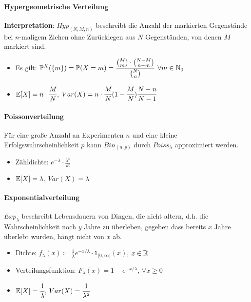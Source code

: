 \newpage
\paragraph{Hypergeometrische Verteilung}
\textbf{Interpretation}: $Hyp_{(N,M,n)}$ beschreibt die Anzahl der markierten Gegenstände bei $n$-maligem Ziehen ohne Zurücklegen aus $N$ Gegenständen, von denen $M$ markiert sind.
\begin{itemize}
	\item Es gilt: $\mathbb{P}^X(\{m\})=\mathbb{P}(X=m)=\cfrac{\binom{M}{m}\cdot\binom{N-M}{n-m}}{\binom{N}{n}}$ \qquad$\forall m\in\mathbb{N}_0$
	\item $\mathbb{E}[X]=n\cdot\cfrac{M}{N}$, $Var(X)=n\cdot\cfrac{M}{N}(1-\cfrac{M}{N})\cfrac{N-n}{N-1}$
\end{itemize}

\paragraph{Poissonverteilung}
Für eine große Anzahl an Experimenten $n$ und eine kleine Erfolgswahrscheinlichkeit $p$ kann $Bin_{(n,p)}$ durch $Poiss_\lambda$ approximiert werden.
\begin{itemize}
	\item Zähldichte: $e^{-\lambda}\cdot\frac{\lambda^k}{k!}$
	\item $\mathbb{E}[X]=\lambda$, $Var(X)=\lambda$
\end{itemize}

\paragraph{Exponentialverteilung}
$Exp_\lambda$ beschreibt Lebensdauern von Dingen, die nicht altern, d.h. die Wahrscheinlichkeit noch $y$ Jahre zu überleben, gegeben dass bereits $x$ Jahre überlebt wurden, hängt nicht von $x$ ab.
\begin{itemize}
	\item Dichte: $f_\lambda(x)\coloneqq\frac{1}{\lambda}e^{-x/\lambda}\cdot\mathds{1}_{[0,\infty)}(x)$, \qquad$x\in\mathbb{R}$
	\item Verteilungsfunktion: $F_\lambda(x)=1-e^{-x/\lambda}$, \qquad$\forall x\geq 0$
	\item $\mathbb{E}[X]=\cfrac{1}{\lambda}$, $Var(X)=\cfrac{1}{\lambda^2}$
\end{itemize}


